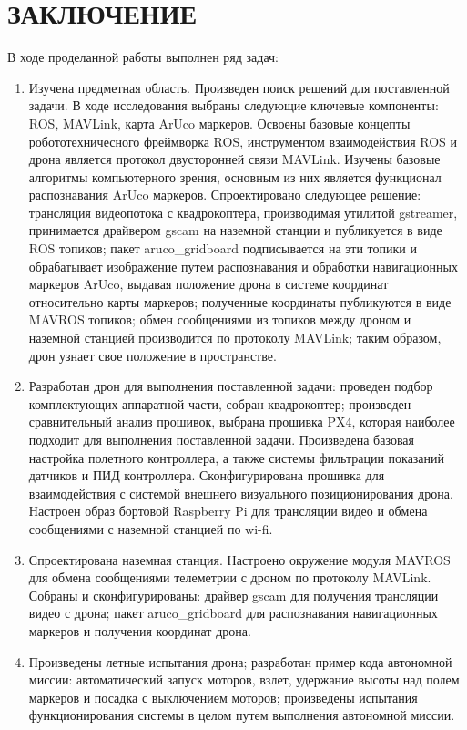 \documentclass[a4paper,12pt]{article}
\begin{document}
\section*{\centering ЗАКЛЮЧЕНИЕ}
В ходе проделанной работы выполнен ряд задач:
\begin{enumerate}
\item Изучена предметная область. Произведен поиск решений для поставленной задачи. В ходе исследования выбраны следующие ключевые компоненты: ROS, MAVLink, карта ArUco маркеров.
Освоены базовые концепты робототехничесного фреймворка ROS, инструментом взаимодействия ROS и дрона является протокол двусторонней связи MAVLink. Изучены базовые алгоритмы компьютерного зрения, основным из них является функционал распознавания ArUco маркеров. Спроектировано следующее решение: трансляция видеопотока с квадрокоптера, производимая утилитой gstreamer, принимается драйвером gscam на наземной станции и публикуется в виде ROS топиков; пакет aruco\_gridboard подписывается на эти топики и обрабатывает изображение путем распознавания и обработки навигационных маркеров ArUco, выдавая положение дрона в системе координат относительно карты маркеров; полученные координаты публикуются в виде MAVROS топиков; обмен сообщениями из топиков между дроном и наземной станцией производится по протоколу MAVLink; таким образом, дрон узнает свое положение в пространстве.
\item Разработан дрон для выполнения поставленной задачи: проведен подбор комплектующих аппаратной части, собран квадрокоптер; произведен сравнительный анализ прошивок, выбрана прошивка PX4, которая наиболее подходит для выполнения поставленной задачи. Произведена базовая настройка полетного контроллера, а также системы фильтрации показаний датчиков и ПИД контроллера. Сконфигурирована прошивка для взаимодействия с системой внешнего визуального позиционирования дрона. Настроен образ бортовой Raspberry Pi для трансляции видео и обмена сообщениями с наземной станцией по wi-fi.
\item Спроектирована наземная станция. Настроено окружение модуля MAV\-ROS для обмена сообщениями телеметрии с дроном по протоколу MAVLink. Собраны и сконфигурированы: драйвер gscam для получения трансляции видео с дрона; пакет aruco\_grid\-board для распознавания навигационных маркеров и получения координат дрона.
\item Произведены летные испытания дрона; разработан пример кода автономной миссии: автоматический запуск моторов, взлет, удержание высоты над полем маркеров и посадка с выключением моторов; произведены испытания функционирования системы в целом путем выполнения автономной миссии.
\end{enumerate}
\end{document}
